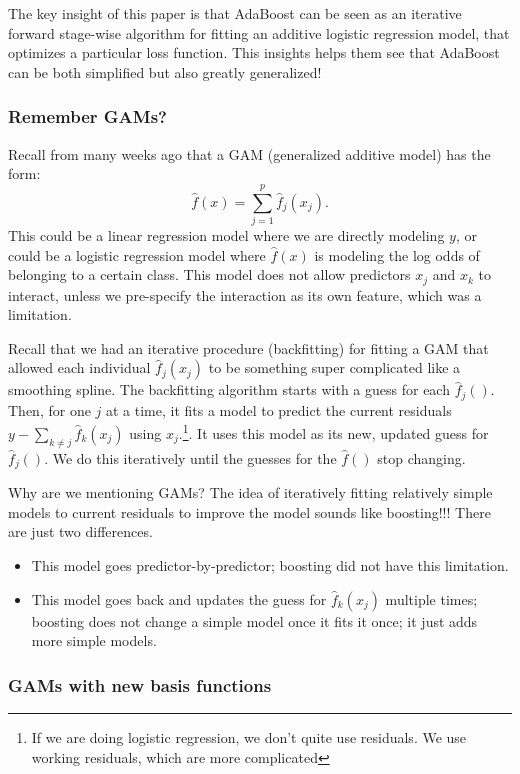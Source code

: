 The key insight of this paper is that AdaBoost can be seen as an iterative forward stage-wise algorithm for fitting an additive logistic regression model, that optimizes a particular loss function. This insights helps them see that AdaBoost can be both simplified but also greatly generalized! 

\subsubsection{Remember GAMs?}

Recall from many weeks ago that a GAM (generalized additive model) has the form: 
$$
\hat{f}(x) = \sum_{j=1}^p \hat{f}_j(x_j).
$$
This could be a linear regression model where we are directly modeling $y$, or could be a logistic regression model where $\hat{f}(x)$ is modeling the log odds of belonging to a certain class.  This model does not allow predictors $x_j$ and $x_k$ to interact, unless we pre-specify the interaction as its own feature, which was a limitation.

Recall that we had an iterative procedure (backfitting) for fitting a GAM that allowed each individual $\hat{f}_j(x_j)$ to be something super complicated like a smoothing spline. The backfitting algorithm starts with a guess for each $\hat{f}_j()$. Then, for one $j$ at a time, it fits a model to predict the current residuals $y - \sum_{k \neq j} \hat{f}_k(x_j)$ using $x_j$.\footnote{If we are doing logistic regression, we don't quite use residuals. We use working residuals, which are more complicated}. It uses this model as its new, updated guess for $\hat{f}_j()$. We do this iteratively until the guesses for the $\hat{f}()$ stop changing. 

Why are we mentioning GAMs? The idea of iteratively fitting relatively simple models to current residuals to improve the model sounds like boosting!!! There are just two differences.
\begin{itemize}
\item This model goes predictor-by-predictor; boosting did not have this limitation.
\item This model goes back and updates the guess for $\hat{f}_k(x_j)$ multiple times; boosting does not change a simple model once it fits it once; it just adds more simple models. 
\end{itemize}

\subsubsection{GAMs with new basis functions}

